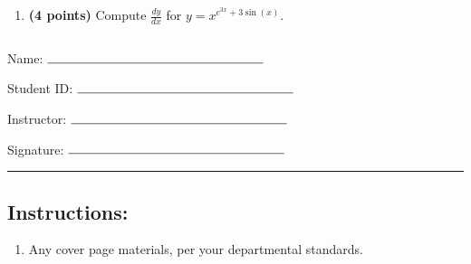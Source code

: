 \documentclass[12pt]{amsart}
\begin{document}
\begin{enumerate}
\vfill 
\def \varexp{3}\def \newexp{2}\def \trigcoeff{3}\def \trigval{+3}\def \oppval{-3}
\item {\bf (4 points)} 
 Compute $\frac{dy}{dx}$ for $y=x^{e^{\varexp x} \trigval \sin(x)}$.

\vfill 
\newpage  $ $   \newpage\end{enumerate}\graphicspath{{C:/Users/iainc/anaconda3/Randomizer/MATH 1001/Midterm 1/}}\setcounter{page}{1}


\thispagestyle{fancy}

 
\noindent Name: $\rule{6cm}{0.15mm}$

\vspace{.2cm}

\noindent Student ID: $\rule{6cm}{0.15mm}$

\vspace{.2cm}

\noindent Instructor: $\rule{6cm}{0.15mm}$

\vspace{.2cm}

\noindent Signature: $\rule{6cm}{0.15mm}$
 



\vspace{.4cm}


\vspace{.4cm}

\hrule

\subsection*{Instructions:} \begin{enumerate}[1.]
\item Any cover page materials, per your departmental standards.
\end{enumerate}
\end{document}

